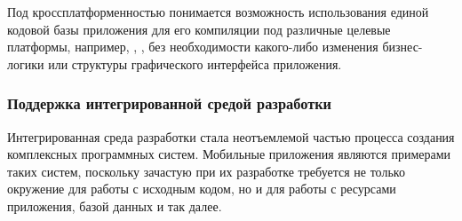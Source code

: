 Под кроссплатформенностью понимается возможность использования единой
кодовой базы приложения для его компиляции под различные целевые платформы,
например, , , без необходимости какого-либо
изменения бизнес-логики или структуры графического интерфейса приложения.

\subsubsection*{Поддержка интегрированной средой разработки}
Интегрированная среда разработки стала неотъемлемой частью процесса
создания комплексных программных систем. Мобильные приложения являются
примерами таких систем, поскольку зачастую при их разработке требуется
не только окружение для работы с исходным кодом, но и для работы с
ресурсами приложения, базой данных и так далее.

